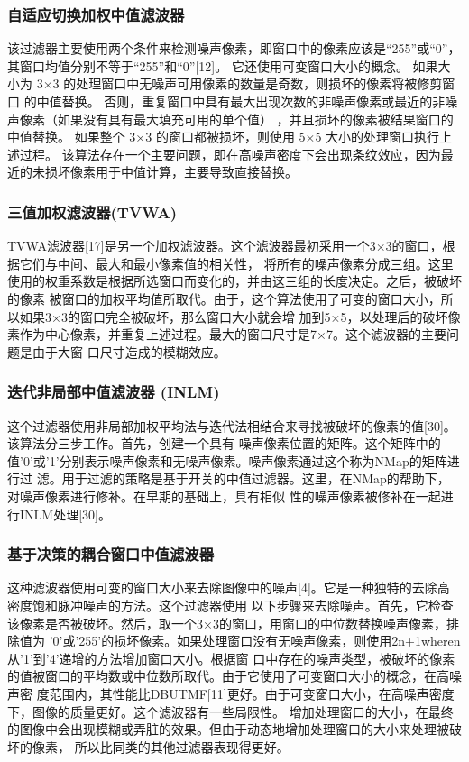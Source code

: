 \documentclass[12pt]{article} %
\begin{document}
\subsubsection{自适应切换加权中值滤波器}
该过滤器主要使用两个条件来检测噪声像素，即窗口中的像素应该是“255”或“0”，其窗口均值分别不等于“255”和“0”[12]。
 它还使用可变窗口大小的概念。 如果大小为 3×3 的处理窗口中无噪声可用像素的数量是奇数，则损坏的像素将被修剪窗口
 的中值替换。 否则，重复窗口中具有最大出现次数的非噪声像素或最近的非噪声像素（如果没有具有最大填充可用的单个值）
 ，并且损坏的像素被结果窗口的中值替换。 如果整个 3×3 的窗口都被损坏，则使用 5×5 大小的处理窗口执行上述过程。 
 该算法存在一个主要问题，即在高噪声密度下会出现条纹效应，因为最近的未损坏像素用于中值计算，主要导致直接替换。

\subsubsection{三值加权滤波器(TVWA)}
 TVWA滤波器[17]是另一个加权滤波器。这个滤波器最初采用一个3×3的窗口，根据它们与中间、最大和最小像素值的相关性，
 将所有的噪声像素分成三组。这里使用的权重系数是根据所选窗口而变化的，并由这三组的长度决定。之后，被破坏的像素
 被窗口的加权平均值所取代。由于，这个算法使用了可变的窗口大小，所以如果3×3的窗口完全被破坏，那么窗口大小就会增
 加到5×5，以处理后的破坏像素作为中心像素，并重复上述过程。最大的窗口尺寸是7×7。这个滤波器的主要问题是由于大窗
 口尺寸造成的模糊效应。

\subsubsection{迭代非局部中值滤波器 (INLM)}
 这个过滤器使用非局部加权平均法与迭代法相结合来寻找被破坏的像素的值[30]。该算法分三步工作。首先，创建一个具有
 噪声像素位置的矩阵。这个矩阵中的值'0'或'1'分别表示噪声像素和无噪声像素。噪声像素通过这个称为NMap的矩阵进行过
 滤。用于过滤的策略是基于开关的中值过滤器。这里，在NMap的帮助下，对噪声像素进行修补。在早期的基础上，具有相似
 性的噪声像素被修补在一起进行INLM处理[30]。

\subsubsection{基于决策的耦合窗口中值滤波器}
这种滤波器使用可变的窗口大小来去除图像中的噪声[4]。它是一种独特的去除高密度饱和脉冲噪声的方法。这个过滤器使用
以下步骤来去除噪声。首先，它检查该像素是否被破坏。然后，取一个3×3的窗口，用窗口的中位数替换噪声像素，排除值为
'0'或'255'的损坏像素。如果处理窗口没有无噪声像素，则使用2n+1wheren从'1'到'4'递增的方法增加窗口大小。根据窗
口中存在的噪声类型，被破坏的像素的值被窗口的平均数或中位数所取代。由于它使用了可变窗口大小的概念，在高噪声密
度范围内，其性能比DBUTMF[11]更好。由于可变窗口大小，在高噪声密度下，图像的质量更好。这个滤波器有一些局限性。
增加处理窗口的大小，在最终的图像中会出现模糊或弄脏的效果。但由于动态地增加处理窗口的大小来处理被破坏的像素，
所以比同类的其他过滤器表现得更好。
\end{document}
